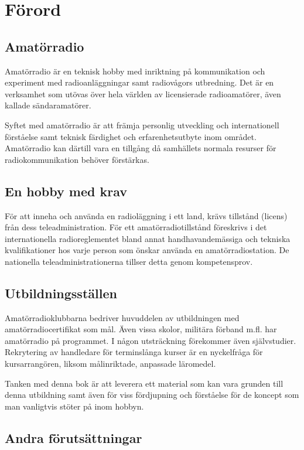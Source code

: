 \chapter*{Förord}
\section*{Amatörradio}
Amatörradio är en teknisk hobby med inriktning på kommunikation och experiment
med radioanläggningar samt radiovågors utbredning. Det är en verksamhet som
utövas över hela världen av licensierade radioamatörer, även kallade
sändaramatörer.

Syftet med amatörradio är att främja personlig utveckling och internationell
förståelse samt teknisk färdighet och erfarenhetsutbyte inom området.
Amatörradio kan därtill vara en tillgång då samhällets normala resurser för
radiokommunikation behöver förstärkas.

\section*{En hobby med krav}

För att inneha och använda en radioläggning i ett land, krävs tillstånd (licens)
från dess teleadministration. För ett amatörradiotillstånd föreskrivs 
i det internationella radioreglementet bland annat handhavandemässiga och 
tekniska kvalifikationer hos varje person som önskar använda en 
amatörradiostation. De nationella teleadministrationerna tillser detta genom 
kompetensprov.

\section*{Utbildningsställen}

Amatörradioklubbarna bedriver huvuddelen av utbildningen med
amatörradiocertifikat som mål. Även vissa skolor, militära förband m.fl. har
amatörradio på programmet. I någon utsträckning förekommer även självstudier.
Rekrytering av handledare för terminslånga kurser är en nyckelfråga för
kursarrangören, liksom målinriktade, anpassade läromedel.

Tanken med denna bok är att leverera ett material som kan vara grunden till 
denna utbildning samt även för viss fördjupning och förståelse för de koncept 
som man vanligtvis stöter på inom hobbyn.

\section*{Andra förutsättningar}

